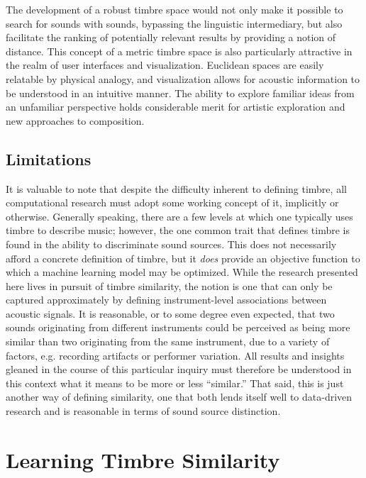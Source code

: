 The development of a robust timbre space would not only make it possible to search for sounds with sounds, bypassing the linguistic intermediary, but also facilitate the ranking of potentially relevant results by providing a notion of distance.
This concept of a metric timbre space is also particularly attractive in the realm of user interfaces and visualization.
Euclidean spaces are easily relatable by physical analogy, and visualization allows for acoustic information to be understood in an intuitive manner.
The ability to explore familiar ideas from an unfamiliar perspective holds considerable merit for artistic exploration and new approaches to composition.


\subsection{Limitations}

It is valuable to note that despite the difficulty inherent to defining timbre, all computational research must adopt some working concept of it, implicitly or otherwise.
Generally speaking, there are a few levels at which one typically uses timbre to describe music;
however, the one common trait that defines timbre is found in the ability to discriminate sound sources.
This does not necessarily afford a concrete definition of timbre, but it \emph{does} provide an objective function to which a machine learning model may be optimized.
While the research presented here lives in pursuit of timbre similarity, the notion is one that can only be captured approximately by defining instrument-level associations between acoustic signals.
It is reasonable, or to some degree even expected, that two sounds originating from different instruments could be perceived as being more similar than two originating from the same instrument, due to a variety of factors, e.g. recording artifacts or performer variation.
All results and insights gleaned in the course of this particular inquiry must therefore be understood in this context what it means to be more or less ``similar.''
That said, this is just another way of defining similarity, one that both lends itself well to data-driven research and is reasonable in terms of sound source distinction.


\section{Learning Timbre Similarity}
\label{sec:timbre_similarity}

